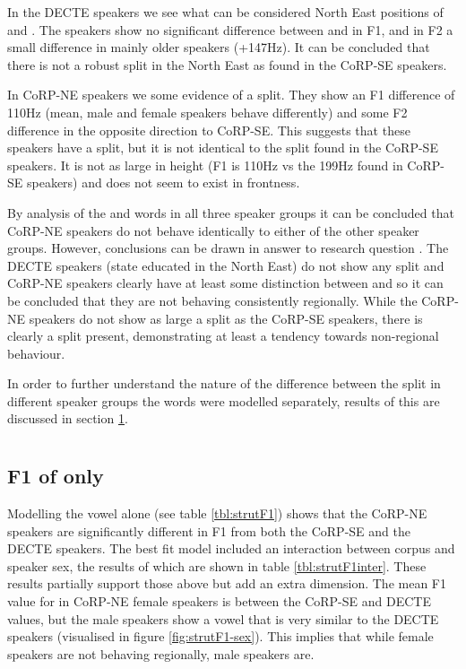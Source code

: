 \documentclass[../../../00.FullDoc/tex/ThesisSkeleton-draft2]{subfiles}
\begin{document}
In the DECTE speakers we see what can be considered  North East \FS{} positions of \foot{} and \strutt{}. The speakers show no significant difference between \foot{} and \strutt{} in F1, and in F2 a small difference in mainly older speakers (+147Hz). It can be concluded that there is not a robust \FS{} split in the North East as found in the CoRP-SE speakers.

In CoRP-NE speakers we some evidence of a split. They show an F1 difference of 110Hz (mean, male and female speakers behave differently) and some F2 difference in the opposite direction to CoRP-SE. This suggests that these speakers have a split, but it is not identical to the split found in the CoRP-SE speakers. It is not as large in height (F1 is 110Hz vs the 199Hz found in CoRP-SE speakers) and does not seem to exist in frontness.

By analysis of the \foot{} and \strutt{} words in all three speaker groups it can be concluded that CoRP-NE speakers do not behave identically to either of the other speaker groups. However, conclusions can be drawn in answer to research question \notinsubfile{\ref{RQ1}}. The DECTE speakers (state educated in the North East) do not show any \FS{} split and CoRP-NE speakers clearly have at least some distinction between \foot{} and \strutt{} so it can be concluded that they are not behaving consistently regionally. While the CoRP-NE speakers do not show as large a split as the CoRP-SE speakers, there is clearly a split present, demonstrating at least a tendency towards non-regional behaviour.

In order to further understand the nature of the difference between the split in different speaker groups the \strutt{} words were modelled separately, results of this are discussed in section \ref{sec:FSSTRUT}.

\section{} \label{sec:FSSTRUT}
\subsection{F1 of  only}

Modelling the \strutt{} vowel alone (see table \ref{tbl:strutF1}) shows that the CoRP-NE speakers are significantly different in F1 from both the CoRP-SE and the DECTE speakers. The best fit model included an interaction between corpus and speaker sex, the results of which are shown in table \ref{tbl:strutF1inter}. These results partially support those above but add an extra dimension. The mean F1 value for \strutt{} in CoRP-NE female speakers is between the CoRP-SE and DECTE values, but the male speakers show a vowel that is very similar to the DECTE speakers (visualised in figure \ref{fig:strutF1-sex}). This implies that while female speakers are not behaving regionally, male speakers are.
\end{document}
